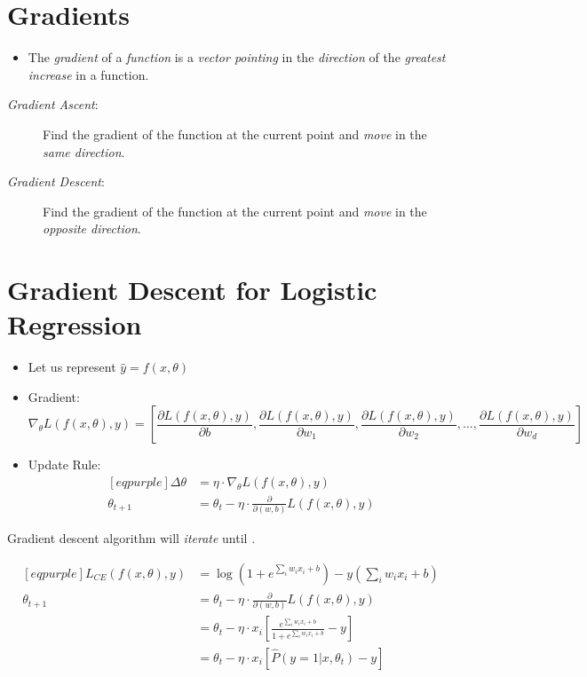 \documentclass[
	number={4},
	title={Logistic Regression}
]{cs584notes}
\begin{document}
\section{Gradients}\label{sec:gradients}
\begin{itemize}
	\item The \emph{gradient} of a \emph{function} is a \emph{vector pointing} in the \emph{direction} of the \emph{greatest increase} in a function.
\end{itemize}
\begin{description}
	\item[\emph{Gradient Ascent}:] Find the gradient of the function at the current point and \emph{move} in the \emph{same direction}.
	\item[\emph{Gradient Descent}:] Find the gradient of the function at the current point and \emph{move} in the \emph{opposite direction}.
\end{description}

\section{Gradient Descent for Logistic Regression}\label{sec:gradient-descent-for-logistic-regression}
\begin{itemize}
	\item Let us represent $\hat{y}=f(x, \theta)$
	\item Gradient:
	\begin{equation}[eqpurple]
		\nabla_{\theta} L(f(x,\theta), y) = \left[ \frac{\partial L(f(x, \theta), y)}{\partial b} , \frac{\partial L(f(x, \theta), y)}{\partial w_{1}}, \frac{\partial L(f(x, \theta), y)}{\partial w_{2}}, \dots, \frac{\partial L(f(x, \theta), y)}{\partial w_{d}} \right]
		\label{eq:gradient}
	\end{equation}
	\item Update Rule:
	\begin{equation}[eqpurple]
	\begin{aligned}[eqpurple]
		\Delta\theta &= \eta\cdot\nabla_{\theta}L(f(x,\theta), y)\\
		\theta_{t+1} &= \theta_{t} - \eta\cdot\frac{\partial}{\partial (w,b)}L(f(x,\theta), y)
	\end{aligned}
	\label{eq:update-rule}
	\end{equation}
\end{itemize}
Gradient descent algorithm will \emph{iterate} until \data{$\Delta\theta < \epsilon$}.

\begin{equation*}
\begin{aligned}[eqpurple]
	L_{CE}(f(x, \theta), y) &= \log\left( 1 + e^{\sum_{i} w_{i}x_{i} + b} \right) - y\left( \sum_{i}w_{i}x_{i} + b \right)\\
	\theta_{t+1} &= \theta_{t} - \eta\cdot\frac{\partial}{\partial (w,b)}L(f(x,\theta), y)\\
				 &= \theta_{t} - \eta\cdot x_{i}\left[ \frac{e^{\sum_{i} w_{i}x_{i} + b}}{1 + e^{\sum_{i} w_{i}x_{i} + b}} - y \right]\\
				 &= \theta_{t} - \eta\cdot x_{i}\left[ \hat{P}(y = 1|x,\theta_{t}) - y \right]
\end{aligned}
\end{equation*}
\end{document}
